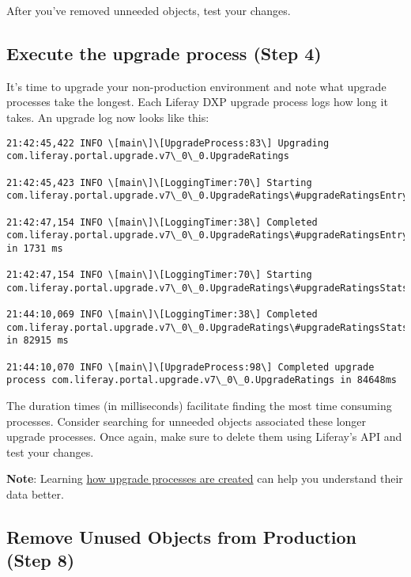 After you've removed unneeded objects, test your changes.

\subsection{Execute the upgrade process (Step
4)}\label{execute-the-upgrade-process-step-4}

It's time to upgrade your non-production environment and note what
upgrade processes take the longest. Each Liferay DXP upgrade process
logs how long it takes. An upgrade log now looks like this:

\begin{verbatim}
21:42:45,422 INFO \[main\]\[UpgradeProcess:83\] Upgrading com.liferay.portal.upgrade.v7\_0\_0.UpgradeRatings

21:42:45,423 INFO \[main\]\[LoggingTimer:70\] Starting com.liferay.portal.upgrade.v7\_0\_0.UpgradeRatings\#upgradeRatingsEntry

21:42:47,154 INFO \[main\]\[LoggingTimer:38\] Completed com.liferay.portal.upgrade.v7\_0\_0.UpgradeRatings\#upgradeRatingsEntry in 1731 ms

21:42:47,154 INFO \[main\]\[LoggingTimer:70\] Starting com.liferay.portal.upgrade.v7\_0\_0.UpgradeRatings\#upgradeRatingsStats

21:44:10,069 INFO \[main\]\[LoggingTimer:38\] Completed com.liferay.portal.upgrade.v7\_0\_0.UpgradeRatings\#upgradeRatingsStats in 82915 ms

21:44:10,070 INFO \[main\]\[UpgradeProcess:98\] Completed upgrade process com.liferay.portal.upgrade.v7\_0\_0.UpgradeRatings in 84648ms
\end{verbatim}

The duration times (in milliseconds) facilitate finding the most time
consuming processes. Consider searching for unneeded objects associated
these longer upgrade processes. Once again, make sure to delete them
using Liferay's API and test your changes.

\noindent\hrulefill

\textbf{Note}: Learning
\href{/docs/7-0/tutorials/-/knowledge_base/t/creating-an-upgrade-process-for-your-app}{how
upgrade processes are created} can help you understand their data
better.

\noindent\hrulefill

\subsection{Remove Unused Objects from Production (Step
8)}\label{remove-unused-objects-from-production-step-8}


